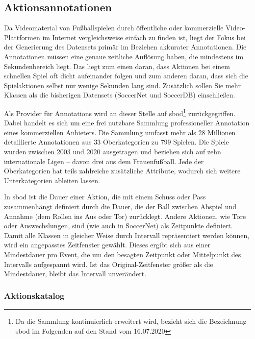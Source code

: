 \subsection{Aktionsannotationen}
\label{subsec:aktionsannotationen}

Da Videomaterial von Fußballspielen durch öffentliche oder kommerzielle Video-Plattformen im Internet vergleichsweise einfach zu finden ist, liegt der Fokus bei der Generierung des Datensets primär im Beziehen akkurater Annotationen.
Die Annotationen müssen eine genaue zeitliche Auflösung haben, die mindestens im Sekundenbereich liegt.
Das liegt zum einen daran, dass Aktionen bei einem schnellen Spiel oft dicht aufeinander folgen und zum anderen daran, dass sich die Spielaktionen selbst nur wenige Sekunden lang sind.
Zusätzlich sollen Sie mehr Klassen als die bisherigen Datensets (SoccerNet und SoccerDB) einschließen.

Als Provider für Annotations wird an dieser Stelle auf \gls{sbod}\footnote{Da die Sammlung kontinuierlich erweitert wird, bezieht sich die Bezeichnung \gls{sbod} im Folgenden auf den Stand vom 16.07.2020} \cite{Statsbomb20} zurückgegriffen.
Dabei handelt es sich um eine frei nutzbare Sammlung professioneller Annotation eines kommerziellen Anbieters.
Die Sammlung umfasst mehr als 28 Millionen detaillierte Annotationen aus 33 Oberkategorien zu 799 Spielen.
Die Spiele wurden zwischen 2003 und 2020 ausgetragen und beziehen sich auf zehn internationale Ligen -- davon drei aus dem Frauenfußball.
Jede der Oberkategorien hat teils zahlreiche zusätzliche Attribute, wodurch sich weitere Unterkategorien ableiten lassen.

In \gls{sbod} ist die Dauer einer Aktion, die mit einem Schuss oder Pass zusammenhängt definiert durch die Dauer, die der Ball zwischen Abspiel und Annahme (\bzw dem Rollen ins Aus oder Tor) zurücklegt.
Andere Aktionen, wie Tore oder Auswechslungen, sind (wie auch in SoccerNet) als Zeitpunkte definiert.
Damit alle Klassen in gleicher Weise durch Intervall repräsentiert werden können, wird ein angepasstes Zeitfenster gewählt.
Dieses ergibt sich aus einer Mindestdauer pro Event, die um den besagten Zeitpunkt oder Mittelpunkt des Intervalls aufgespannt wird.
Ist das Original-Zeitfenster größer als die Mindestdauer, bleibt das Intervall unverändert.

\subsubsection*{Aktionskatalog}

